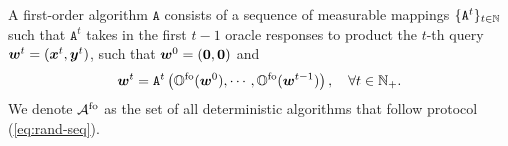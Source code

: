 \documentclass{article}
\begin{document}
\begin{dfn} \label{dfn:rand-alg}
A first-order algorithm $\texttt{A}$ consists of a sequence of measurable mappings $\{ \texttt{A}^{t}\}_{t \in {\mathbb{N}}}$ such that $ \texttt{A}^{t}$ takes in the first $t-1$ oracle responses to product the $t$-th query ${\bm{w}}^t = ({\bm{x}}^t,{\bm{y}}^t)$, such that ${\bm{w}}^0 = ({\bm{0}},{\bm{0}})$ and  
\begin{align}  \label{eq:rand-seq}
    {\bm{w}}^t = \texttt{A}^t \left({\mathbb{O}}^{\rm fo}({\bm{w}}^0), \cdots, {\mathbb{O}}^{\rm fo}({\bm{w}}^{t-1}) \right), \quad \forall t \in {\mathbb{N}}_+.
\end{align}                                                                             
We denote ${\mathcal{A}}^{{\rm fo}}$ as the set of all deterministic algorithms that follow protocol (\ref{eq:rand-seq}).
\end{dfn}
\end{document}
